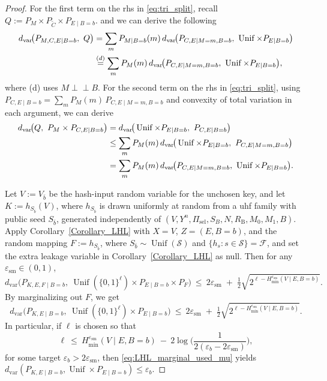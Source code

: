 \documentclass[onecolumn]{IEEEtran} %
\newcommand{\1}{\mathbbm{1}}
\theoremstyle{boldremark}
\DeclareMathOperator{\Unif}{Unif}
\newcommand{\pperp}{\mathrel{\perp\!\!\!\perp}}
\begin{document}
\begin{proof}
For the first term on the \gls{rhs} in \eqref{eq:tri_split}, recall \(
Q:=P_M\times P_{\widetilde C}\times P_{E\mid B=b}.
\) and we can derive the following
\begin{align}
d_{\mathrm{var}}\!\big(P_{M,C,E\mid B=b},\ Q\big)
&=\sum_{m}P_{M\mid B=b}(m)\,
d_{\mathrm{var}}\!\big(P_{C,E\mid M=m,B=b},\ \Unif\times P_{E\mid B=b}\big)\notag\\
&\overset{(d)}{=}\sum_{m}P_{M}(m)\,
d_{\mathrm{var}}\!\big(P_{C,E\mid M=m,B=b},\ \Unif\times P_{E\mid B=b}\big),
\label{eq:first_term_as_avg_mu}
\end{align}
where (d) uses $M\pperp B$. For the second term on the \gls{rhs} in \eqref{eq:tri_split}, using
$P_{C,E\mid B=b}=\sum_m P_M(m)\,P_{C,E\mid M=m,B=b}$ and convexity of total variation in each argument, we can derive
\begin{align}
d_{\mathrm{var}}\!\big(Q,\ P_M\times P_{C,E\mid B=b}\big)
&=d_{\mathrm{var}}\!\big(\Unif\times P_{E\mid B=b},\ P_{C,E\mid B=b}\big)\notag\\
&\le \sum_m P_M(m)\,
d_{\mathrm{var}}\!\big(\Unif\times P_{E\mid B=b},\ P_{C,E\mid M=m,B=b}\big)\notag\\
&=\sum_m P_M(m)\,
d_{\mathrm{var}}\!\big(P_{C,E\mid M=m,B=b},\ \Unif\times P_{E\mid B=b}\big).
\label{eq:second_term_as_avg_mu}
\end{align}

Let \(V:=V_{\bar b}\) be the hash-input random variable for the unchosen key, and let
\(K:=h_{S_{\bar b}}(V)\), where \(h_{S_{\bar b}}\) is drawn uniformly at random from a \gls{uhf} family
with public seed \(S_{\bar b}\), generated independently of \((V,Y^n,\Pi_{\mathrm{sel}},S_B,N,R_{\mathrm B},M_0,M_1,B)\).
Apply Corollary~\ref{Corollary_LHL} with \(X=V\), \(Z=(E,B=b)\), and the random mapping
\(F:=h_{S_{\bar b}}\), where \(S_{\bar b}\sim\Unif(\mathcal{S})\) and \(\{h_s:s\in\mathcal{S}\}=\mathcal{F}\),
and set the extra leakage variable in Corollary~\ref{Corollary_LHL} as null.
Then for any \(\varepsilon_{\mathrm{sm}}\in(0,1)\),
\begin{equation}\label{eq:LHL_general_form_used}
d_{\mathrm{var}}\!\big(P_{K,E,F\mid B=b},\ \Unif(\{0,1\}^{\ell})\times P_{E\mid B=b}\times P_{F}\big)
\ \le\ 2\varepsilon_{\mathrm{sm}} \;+\; \tfrac12\sqrt{2^{\ell - H_{\min}^{\varepsilon_{\mathrm{sm}}}(V\mid E,B=b)}}.
\end{equation}
By marginalizing out \(F\), we get
\begin{equation}\label{eq:LHL_marginal_used_mu}
d_{\mathrm{var}}\!\big(P_{K,E\mid B=b},\ \Unif(\{0,1\}^{\ell})\times P_{E\mid B=b}\big)
\ \le\ 2\varepsilon_{\mathrm{sm}} \;+\; \tfrac12\sqrt{2^{\ell - H_{\min}^{\varepsilon_{\mathrm{sm}}}(V\mid E,B=b)}}.
\end{equation}
In particular, if \(\ell\) is chosen so that
\begin{equation}\label{eq:LHL_len_condition_general}
\ell\ \le\ H_{\min}^{\varepsilon_{\mathrm{sm}}}(V\mid E,B=b)
\ -\ 2\log\!\Big(\frac{1}{2(\varepsilon_b-2\varepsilon_{\mathrm{sm}})}\Big),
\end{equation}
for some target \(\varepsilon_b>2\varepsilon_{\mathrm{sm}}\), then \eqref{eq:LHL_marginal_used_mu} yields
\(d_{\mathrm{var}}(P_{K,E\mid B=b},\Unif\times P_{E\mid B=b})\le\varepsilon_b\).



\end{proof}
\end{document}
